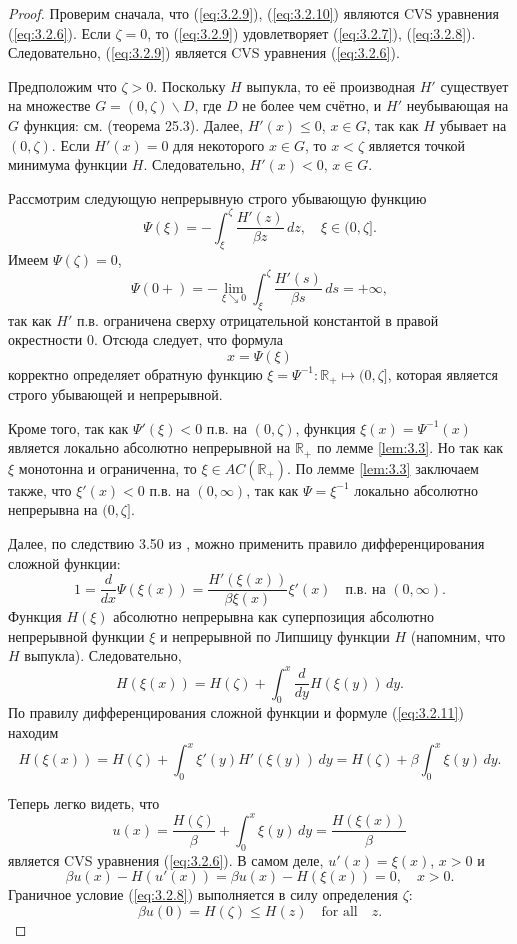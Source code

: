 \begin{proof}
Проверим сначала, что (\ref{eq:3.2.9}), (\ref{eq:3.2.10}) являются CVS уравнения (\ref{eq:3.2.6}). Если $\zeta=0$, то (\ref{eq:3.2.9}) удовлетворяет (\ref{eq:3.2.7}), (\ref{eq:3.2.8}). Следовательно, (\ref{eq:3.2.9}) является CVS уравнения (\ref{eq:3.2.6}).

Предположим что $\zeta>0$. Поскольку $H$ выпукла, то её производная $H'$ существует на множестве $G=(0,\zeta)\backslash D$, где $D$ не более чем счётно, и $H'$ неубывающая на $G$ функция: см. \cite{Roc70} (теорема 25.3). Далее, $H'(x)\le 0$, $x\in G$, так как $H$ убывает на $(0,\zeta)$. Если $H'(x)=0$ для некоторого $x\in G$, то $x<\zeta$ является точкой минимума функции $H$. Следовательно, $H'(x)<0$, $x\in G$.

Рассмотрим следующую непрерывную строго убывающую функцию
$$ \Psi(\xi)=-\int_\xi^{\zeta}\frac{H'(z)}{\beta z}\,dz,\quad \xi\in (0,\zeta].$$
Имеем $\Psi(\zeta)=0$,
$$ \Psi(0+)=-\lim_{\xi\searrow 0} \int_\xi^{\zeta}\frac{H'(s)}{\beta s}\,ds=+\infty,$$
так как $H'$ п.в. ограничена сверху отрицательной константой в правой окрестности $0$.
Отсюда следует, что формула
$$ x=\Psi(\xi)$$
корректно определяет обратную функцию $\xi=\Psi^{-1}:\mathbb R_+\mapsto (0,\zeta]$, которая является строго убывающей и непрерывной.

Кроме того, так как $\Psi'(\xi)<0$ п.в. на  $(0,\zeta)$, функция $\xi(x)=\Psi^{-1}(x)$ является локально  абсолютно непрерывной на $\mathbb R_+$ по лемме \ref{lem:3.3}. Но так как $\xi$ монотонна и ограниченна, то $\xi\in AC(\mathbb R_+)$.
По лемме \ref{lem:3.3} заключаем также, что $\xi'(x)<0$ п.в. на $(0,\infty)$, так как $\Psi=\xi^{-1}$ локально  абсолютно непрерывна на $(0,\zeta]$.

Далее, по следствию 3.50 из \cite{Leo09}, можно применить правило дифференцирования сложной функции:
\begin{equation} \label{eq:3.2.11}
 1=\frac{d}{dx}\Psi(\xi(x))=\frac{H'(\xi(x))}{\beta\xi(x)}\xi'(x)\quad \textrm{п.в. на } (0,\infty).
\end{equation}
Функция $H(\xi)$ абсолютно непрерывна как суперпозиция абсолютно непрерывной функции $\xi$ и непрерывной по Липшицу функции $H$ (напомним, что $H$ выпукла). Следовательно,
$$ H(\xi(x))=H(\zeta)+\int_0^x \frac{d}{dy}H(\xi(y))\,dy.$$
По правилу дифференцирования сложной функции и формуле (\ref{eq:3.2.11}) находим
$$ H(\xi(x))=H(\zeta)+\int_0^x\xi'(y) H'(\xi(y))\,dy=H(\zeta)+\beta\int_0^x \xi(y)\,dy.$$

Теперь легко видеть, что
$$ u(x)=\frac{H(\zeta)}{\beta}+\int_0^x\xi(y)\,dy=\frac{H(\xi(x))}{\beta}$$
является CVS уравнения (\ref{eq:3.2.6}). В самом деле, $u'(x)=\xi(x)$, $x>0$ и
$$\beta u(x)-H(u'(x))=\beta u(x)-H(\xi(x))=0,\quad x>0.$$
Граничное условие (\ref{eq:3.2.8}) выполняется в силу определения $\zeta$:
$$ \beta u(0)=H(\zeta)\le H(z)\quad \text{for all}\quad z.$$


\end{proof}
